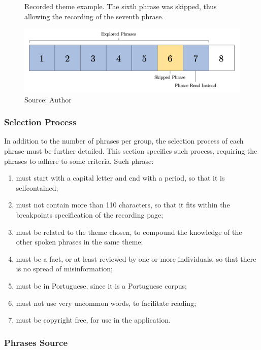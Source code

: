 \begin{figure}[h]
    \centering
    \caption{Recorded theme example. The sixth phrase was skipped, thus allowing the recording of the seventh phrase.}
    \includegraphics[width=\linewidth]{images/sw-req-spec/phrase-skip.png}
    \caption*{Source: Author}
    \label{fig:falealgumacoisa-phrase-skip}
\end{figure}

\subsubsection{Selection Process}

In addition to the number of phrases per group, the selection process of each phrase must be further detailed. This section specifies such process, requiring the phrases to adhere to some criteria. Such phrase:

\begin{enumerate}
    \item must start with a capital letter and end with a period, so that it is selfcontained;
    \item must not contain more than 110 characters, so that it fits within the breakpoints specification of the recording page;
    \item must be related to the theme chosen, to compound the knowledge of the other spoken phrases in the same theme;
    \item must be a fact, or at least reviewed by one or more individuals, so that there is no spread of misinformation;
    \item must be in Portuguese, since it is a Portuguese corpus;
    \item must not use very uncommon words, to facilitate reading;
    \item must be copyright free, for use in the application.
\end{enumerate}

\subsubsection{Phrases Source}

